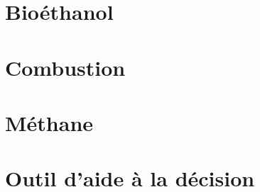 \documentclass[11pt,a4paper]{article}
\begin{document}
\renewcommand{\currentColor}{bluesword}
\renewcommand{\sectionImage}{bioethanol.jpg}
\section{Bioéthanol}
\label{sec:bioethanol}
\renewcommand{\headersColor}{bluesword}









\renewcommand{\currentColor}{amber}
\renewcommand{\sectionImage}{combustion.jpg}
\section{Combustion}
\label{sec:combustion}
\renewcommand{\headersColor}{amber}








\renewcommand{\currentColor}{violet}
\renewcommand{\sectionImage}{methanisation.jpg}
\section{Méthane}
\label{sec:methane}
\renewcommand{\headersColor}{violet}








\renewcommand{\currentColor}{themeColor}
\renewcommand{\sectionImage}{aide_decision.jpg}
\section{Outil d'aide à la décision}
\label{sec:outil-daide-la-decision}
\renewcommand{\headersColor}{themeColor}




\end{document}
